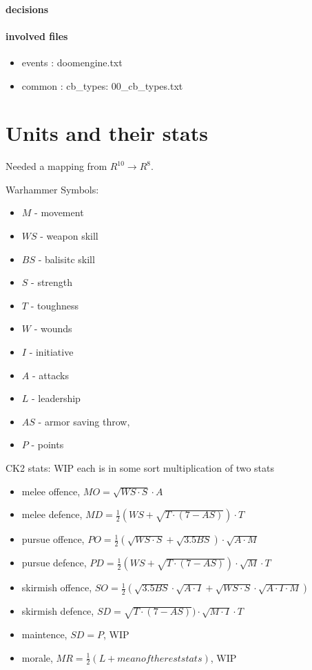 \documentclass[10pt, english]{article}
\begin{document}
\paragraph{decisions}

\paragraph{involved files}
\begin{itemize}
\item  events : doomengine.txt
\item common : cb\_types: 00\_cb\_types.txt
\end{itemize}

\section{Units and their stats}
Needed a mapping from $R^{10} \to R^8$.

Warhammer Symbols:
\begin{itemize}
\item $M$ - movement
\item $WS$ - weapon skill
\item $BS$ - balisitc skill
\item $S$ - strength
\item $T$ - toughness
\item $W$ - wounds
\item $I$ - initiative
\item  $A$ - attacks
\item $L$ - leadership
\item $AS$ - armor saving throw,
\item $P$ - points
\end{itemize}
CK2 stats: WIP
each is in some sort multiplication of two stats
\begin{itemize}

\item melee offence, $MO = \sqrt{WS \cdot S }\cdot A $

\item melee defence,
$MD = \frac{1}{2}(WS + \sqrt{T\cdot (7-AS)})\cdot T$

\item pursue offence, 
$PO = \frac{1}{2}(\sqrt{WS \cdot S} + \sqrt{3.5 BS})\cdot \sqrt{A\cdot M}$

\item pursue defence, 
$PD = \frac{1}{2}(WS + \sqrt{T\cdot (7-AS)})\cdot \sqrt{M}\cdot T$

\item skirmish offence, 
$SO = \frac{1}{2} \left( 
\sqrt{3.5BS} \cdot \sqrt{A\cdot I} + 
\sqrt{WS\cdot S} \cdot \sqrt{A\cdot I\cdot M}
\right)$

\item skirmish defence, 
$SD = \sqrt{T\cdot (7-AS)})\cdot \sqrt{M\cdot I}\cdot T$

\item maintence, $SD = P$, WIP
\item morale, $MR = \frac{1}{2} (L + mean of the rest stats)$, WIP

\end{itemize}
\end{document}
